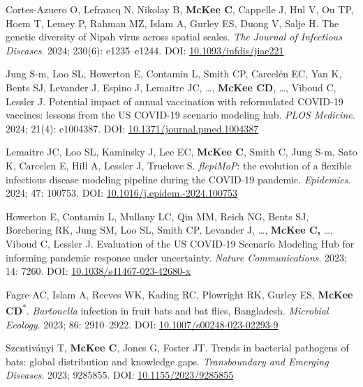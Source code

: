 \documentclass{cv}
\begin{document}
\begin{pubenum}
\item Cortes-Azuero O, Lefrancq N, Nikolay B, \textbf{McKee C}, Cappelle J, Hul V, Ou TP, Hoem T, Lemey P, Rahman MZ, Islam A, Gurley ES, Duong V, Salje H. The genetic diversity of Nipah virus across spatial scales. \textit{The Journal of Infectious Diseases}. 2024; 230(6): e1235--e1244. DOI: \href{https://doi.org/10.1093/infdis/jiae221}{10.1093/infdis/jiae221}

\item Jung S-m, Loo SL, Howerton E, Contamin L, Smith CP, Carcelén EC, Yan K, Bents SJ, Levander J, Espino J, Lemaitre JC, …, \textbf{McKee CD}, …, Viboud C, Lessler J. Potential impact of annual vaccination with reformulated COVID-19 vaccines: lessons from the US COVID-19 scenario modeling hub. \textit{PLOS Medicine}. 2024; 21(4): e1004387. DOI: \href{https://doi.org/10.1371/journal.pmed.1004387}{10.1371/journal.pmed.1004387}

\item Lemaitre JC, Loo SL, Kaminsky J, Lee EC, \textbf{McKee C}, Smith C, Jung S-m, Sato K, Carcelen E, Hill A, Lessler J, Truelove S. \textit{flepiMoP}: the evolution of a flexible infectious disease modeling pipeline during the COVID-19 pandemic. \textit{Epidemics}. 2024; 47: 100753. DOI: \href{https://doi.org/10.1016/j.epidem.2024.100753}{10.1016/j.epidem.-2024.100753}

\item Howerton E, Contamin L, Mullany LC, Qin MM, Reich NG, Bents SJ, Borchering RK, Jung SM, Loo SL, Smith CP, Levander J, …, \textbf{McKee C,} …, Viboud C, Lessler J. Evaluation of the US COVID-19 Scenario Modeling Hub for informing pandemic response under uncertainty. \textit{Nature Communications}. 2023; 14: 7260. DOI: \href{https://doi.org/10.1038/s41467-023-42680-x}{10.1038/s41467-023-42680-x}

\item Fagre AC, Islam A, Reeves WK, Kading RC, Plowright RK, Gurley ES, \textbf{McKee CD}\textsuperscript{*}. \textit{Bartonella} infection in fruit bats and bat flies, Bangladesh. \textit{Microbial Ecology}. 2023; 86: 2910--2922. DOI: \href{https://doi.org/10.1007/s00248-023-02293-9}{10.1007/s00248-023-02293-9}

\item Szentiványi T, \textbf{McKee C}, Jones G, Foster JT. Trends in bacterial pathogens of bats: global distribution and knowledge gaps. \textit{Transboundary and Emerging Diseases}. 2023; 9285855. DOI: \href{https://doi.org/10.1155/2023/9285855}{10.1155/2023/9285855}


\end{pubenum}
\end{document}

